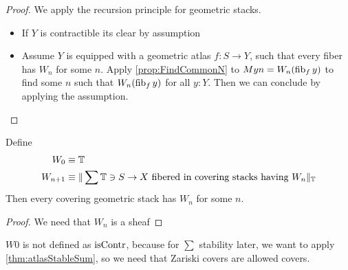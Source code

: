 \begin{proof}
		We apply the recursion principle for geometric stacks.
	\begin{itemize}
		\item If $Y$ is contractible its clear by assumption
		\item Assume $Y$ is equipped with a geometric atlas $f : S \to Y$, such that every fiber has $W_n$ for some $n$. Apply \ref{prop:FindCommonN} to $M y n = W_n (\operatorname{fib}_f y)$ to find some $n$ such that $W_n (\operatorname{fib}_f y)$ for all $y : Y$.
		Then we can conclude by applying the assumption.
	
	\end{itemize}
\end{proof}


\begin{corollary}
	Define \begin{align*}
		W_0 &\equiv \mathbb{T} \\
		W_{n+1} &\equiv \| \sum \mathbb{T} \ni S \to X \text{ fibered in covering stacks having } W_n \|_{\mathbb{T}}
	\end{align*}
	Then every covering geometric stack has $W_n$ for some $n$.
\end{corollary}
\begin{proof}
	We need that $W_n$ is a sheaf 
\end{proof}
\begin{why}
	$W 0 $ is not defined as $\operatorname{isContr}$, because for $\sum$ stability later, we want to apply \ref{thm:atlasStableSum}, so we need that Zariski covers are allowed covers.
\end{why}
